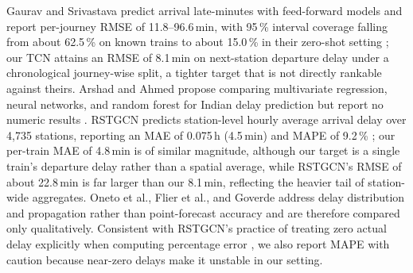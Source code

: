 \documentclass[a4paper,fleqn]{cas-dc}
\begin{document}
Gaurav and Srivastava predict arrival late-minutes with feed-forward models
and report per-journey RMSE of 11.8--96.6\,min, with 95\,\% interval coverage
falling from about 62.5\,\% on known trains to about 15.0\,\% in their
zero-shot setting \citep{gaurav2018zeroshot}; our TCN attains an RMSE of
8.1\,min on next-station departure delay under a chronological journey-wise
split, a tighter target that is not directly rankable against theirs. Arshad
and Ahmed propose comparing multivariate regression, neural networks, and
random forest for Indian delay prediction but report no numeric results
\citep{arshad2019prediction}. RSTGCN predicts station-level hourly average
arrival delay over 4{,}735 stations, reporting an MAE of 0.075\,h
(4.5\,min) and MAPE of 9.2\,\% \citep{chowdhury2025rstgcn}; our per-train MAE
of 4.8\,min is of similar magnitude, although our target is a single train's
departure delay rather than a spatial average, while RSTGCN's RMSE of about
22.8\,min is far larger than our 8.1\,min, reflecting the heavier tail of
station-wide aggregates. Oneto et al., Flier et al., and Goverde
\citep{oneto2018train,flier2009delay,goverde2010railway} address delay
distribution and propagation rather than point-forecast accuracy and are
therefore compared only qualitatively. Consistent with RSTGCN's practice of
treating zero actual delay explicitly when computing percentage error
\citep{chowdhury2025rstgcn}, we also report MAPE with caution because
near-zero delays make it unstable in our setting.
\end{document}
